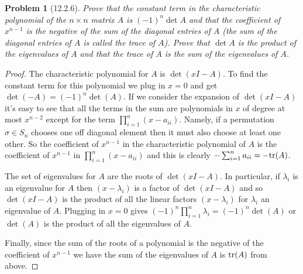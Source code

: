 \documentclass{article}
\newcommand{\tr}{\textup{tr}}
\newtheorem{problem}{Problem}
\begin{document}
\begin{problem}[12.2.6]
Prove that the constant term in the characteristic polynomial of the $n \times n$ matrix $A$ is $(-1)^n \det A$ and that the coefficient of $x^{n-1}$ is the negative of the sum of the diagonal entries of $A$ (the sum of the diagonal entries of $A$ is called the \emph{trace} of $A$). Prove that $\det A$ is the product of the eigenvalues of $A$ and that the trace of $A$ is the sum of the eigenvalues of $A$.
\end{problem}
\begin{proof}
The characteristic polynomial for $A$ is $\det(xI - A)$. To find the constant term for this polynomial we plug in $x = 0$ and get $\det(-A) = (-1)^n \det(A)$. If we consider the expansion of $\det(xI - A)$ it's easy to see that all the terms in the sum are polynomials in $x$ of degree at most $x^{n-2}$ except for the term $\prod_{i=1}^{n} (x-a_{ii})$. Namely, if a permutation $\sigma \in S_n$ chooses one off diagonal element then it must also choose at least one other. So the coefficient of $x^{n-1}$ in the characteristic polynomial of $A$ is the coefficient of $x^{n-1}$ in $\prod_{i=1}^{n} (x-a_{ii})$ and this is clearly $- \sum_{i=1}^{n} a_{ii} = -\tr (A)$.

The set of eigenvalues for $A$ are the roots of $\det(xI - A)$. In particular, if $\lambda_i$ is an eigenvalue for $A$ then $(x-\lambda_i)$ is a factor of $\det(xI - A)$ and so $\det(xI - A)$ is the product of all the linear factors $(x-\lambda_i)$ for $\lambda_i$ an eigenvalue of $A$. Plugging in $x = 0$ gives $(-1)^n \prod_{i=1}^{n} \lambda_i = (-1)^n \det(A)$ or $\det(A)$ is the product of all the eigenvalues of $A$.

Finally, since the sum of the roots of a polynomial is the negative of the coefficient of $x^{n-1}$ we have the sum of the eigenvalues of $A$ is $\tr(A)$ from above.
\end{proof}
\end{document}
